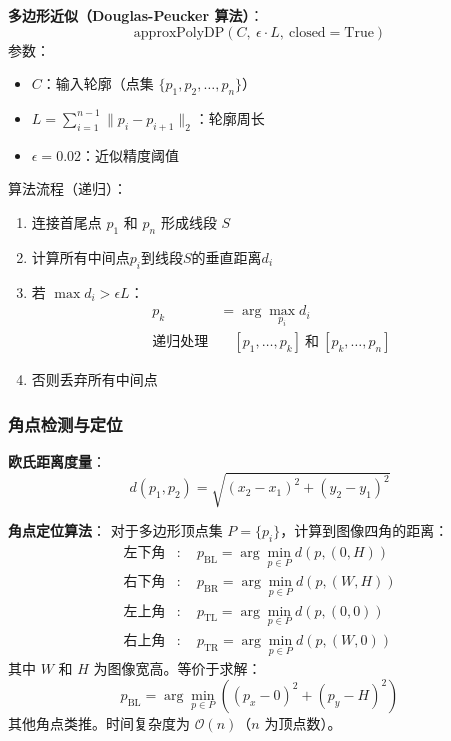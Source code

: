\documentclass[12pt, a4paper]{article}
\begin{document}
\textbf{多边形近似（Douglas-Peucker 算法）}：
\begin{equation}
\text{approxPolyDP}(C,\ \epsilon \cdot L,\ \text{closed}=\text{True})
\end{equation}
参数：
\begin{itemize}
  \item $C$：输入轮廓（点集 $\{p_1, p_2, \dots, p_n\}$）
  \item $L = \sum_{i=1}^{n-1} \|p_i - p_{i+1}\|_2$：轮廓周长
  \item $\epsilon = 0.02$：近似精度阈值
\end{itemize}
算法流程（递归）：
\begin{enumerate}
  \item 连接首尾点 $p_1$ 和 $p_n$ 形成线段 $S$
  \item 计算所有中间点$p_i$到线段$S$的垂直距离$d_i$
  \item 若 $\max d_i > \epsilon L$：
    \begin{align*}
      p_k &= \arg\max_{p_i} d_i \\
      \text{递归处理} &\quad [p_1, \dots, p_k]\ \text{和}\ [p_k, \dots, p_n]
    \end{align*}
  \item 否则丢弃所有中间点
\end{enumerate}

\subsubsection{角点检测与定位}
\textbf{欧氏距离度量}：
\begin{equation}
d(p_1, p_2) = \sqrt{(x_2 - x_1)^2 + (y_2 - y_1)^2}
\end{equation}

\textbf{角点定位算法}：
对于多边形顶点集 $P = \{p_i\}$，计算到图像四角的距离：
\begin{align*}
\text{左下角} &: \quad p_{\text{BL}} = \arg\min_{p \in P} d(p, (0, H)) \\
\text{右下角} &: \quad p_{\text{BR}} = \arg\min_{p \in P} d(p, (W, H)) \\
\text{左上角} &: \quad p_{\text{TL}} = \arg\min_{p \in P} d(p, (0, 0)) \\
\text{右上角} &: \quad p_{\text{TR}} = \arg\min_{p \in P} d(p, (W, 0))
\end{align*}
其中 $W$ 和 $H$ 为图像宽高。等价于求解：
\begin{equation}
p_{\text{BL}} = \arg\min_{p \in P} \left( (p_x - 0)^2 + (p_y - H)^2 \right)
\end{equation}
其他角点类推。时间复杂度为 $\mathcal{O}(n)$（$n$ 为顶点数）。
\end{document}
